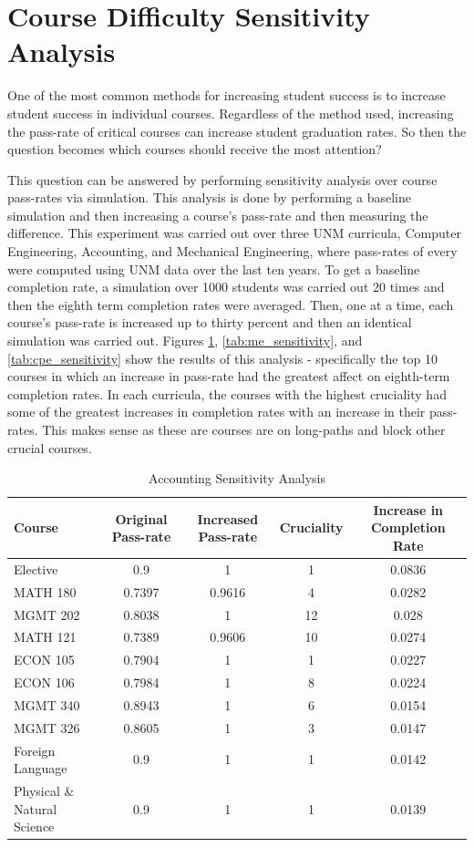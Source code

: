 \documentclass[botnum, fleqn]{unmeethesis}
\begin{document}
    \section{Course Difficulty Sensitivity Analysis}
      One of the most common methods for increasing student success is to increase student success in individual courses. Regardless of the method used, increasing the pass-rate of critical courses can increase student graduation rates. So then the question becomes which courses should receive the most attention?

      This question can be answered by performing sensitivity analysis over course pass-rates via simulation. This analysis is done by performing a baseline simulation and then increasing a course's pass-rate and then measuring the difference. This experiment was carried out over three UNM curricula, Computer Engineering, Accounting, and Mechanical Engineering, where pass-rates of every were computed using UNM data over the last ten years. To get a baseline completion rate, a simulation over 1000 students was carried out 20 times and then the eighth term completion rates were averaged. Then, one at a time, each course's pass-rate is increased up to thirty percent and then an identical simulation was carried out. Figures \ref{tab:accounting_sensitivity}, \ref{tab:me_sensitivity}, and \ref{tab:cpe_sensitivity} show the results of this analysis - specifically the top 10 courses in which an increase in pass-rate had the greatest affect on eighth-term completion rates. In each curricula, the courses with the highest cruciality had some of the greatest increases in completion rates with an increase in their pass-rates. This makes sense as these are courses are on long-paths and block other crucial courses.

      \begin{table}[!h]
      \tiny
      \begin{tabular}{l*{4}{c}}
      Course & Original Pass-rate & Increased Pass-rate & Cruciality & Increase in Completion Rate \\
      \hline
      Elective & 0.9 & 1 & 1 & 0.0836 \\
      MATH 180 & 0.7397 & 0.9616 & 4 & 0.0282 \\
      MGMT 202 & 0.8038 & 1 & 12 & 0.028 \\
      MATH 121 & 0.7389 & 0.9606 & 10 & 0.0274 \\
      ECON 105 & 0.7904 & 1 & 1 & 0.0227 \\
      ECON 106 & 0.7984 & 1 & 8 & 0.0224 \\
      MGMT 340 & 0.8943 & 1 & 6 & 0.0154 \\
      MGMT 326 & 0.8605 & 1 & 3 & 0.0147 \\
      Foreign Language & 0.9 & 1 & 1 & 0.0142 \\
      Physical \& Natural Science & 0.9 & 1 & 1 & 0.0139 \\
      \end{tabular}
      \caption{Accounting Sensitivity Analysis} 
      \label{tab:accounting_sensitivity}
      \end{table}
\end{document}
